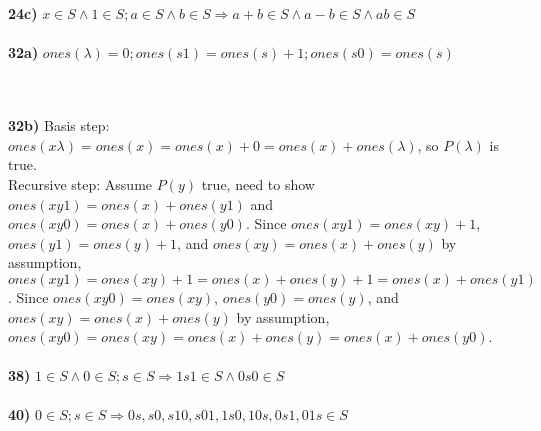 \documentclass{article}
\begin{document}
\\\\\noindent\textbf{24c)} $x\in S \wedge 1 \in S; a\in S \wedge b\in S \Rightarrow a+b\in S \wedge a-b\in S \wedge ab\in S$
\\\\\noindent\textbf{32a)} $ones(\lambda) = 0; ones(s1) = ones(s)+1; ones(s0)=ones(s)$

\\\\\noindent\textbf{32b)} Basis step: $ones(x\lambda)=ones(x)=ones(x)+0=ones(x)+ones(\lambda)$, so $P(\lambda)$ is true.
\\Recursive step: Assume $P(y)$ true, need to show $ones(xy1)=ones(x)+ones(y1)$ and $ones(xy0)=ones(x)+ones(y0)$. Since $ones(xy1) = ones(xy)+1$, $ones(y1)=ones(y)+1$, and $ones(xy)=ones(x)+ones(y)$ by assumption, $ones(xy1)=ones(xy)+1=ones(x)+ones(y)+1=ones(x)+ones(y1)$. Since $ones(xy0) = ones(xy)$, $ones(y0)=ones(y)$, and $ones(xy)=ones(x)+ones(y)$ by assumption, $ones(xy0)=ones(xy)=ones(x)+ones(y)=ones(x)+ones(y0)$. 
\\\\\noindent\textbf{38)}  $1\in S \wedge 0 \in S; s\in S \Rightarrow 1s1\in S \wedge 0s0\in S$
\\\\\noindent\textbf{40)} $0\in S; s\in S \Rightarrow 0s,s0,s10,s01,1s0,10s,0s1,01s\in S$
\end{document}
